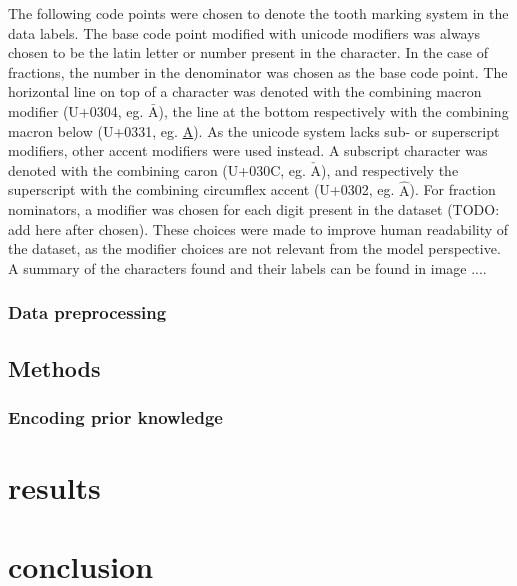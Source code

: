 \documentclass{article}
\begin{document}
The following code points were chosen to denote the tooth marking system in the data labels.
The base code point modified with unicode modifiers was always chosen to be the latin letter or number present in the character. In the case of 
fractions, the number in the denominator was chosen as the base code point. The horizontal line on top of a character was denoted with the
combining macron modifier (U+0304, eg. $\bar{\text{A}}$), the line at the bottom respectively with the combining macron below (U+0331, eg. \underline{A}).
As the unicode system lacks sub- or superscript modifiers, other accent modifiers were used instead. A subscript character was denoted with the combining caron (U+030C, eg. $\check{\mathrm{A}}$), and respectively the superscript with the combining
circumflex accent (U+0302, eg. $\hat{\text{A}}$). For fraction nominators, a modifier was chosen for each digit present in the dataset (TODO: add here after chosen).
These choices were made to improve human readability of the dataset, as the modifier choices are not relevant from the model perspective. A summary of the 
characters found and their labels can be found in image ....

\subsubsection{Data preprocessing}

\subsection{Methods}

\subsubsection{Encoding prior knowledge}

\section{results}

\section{conclusion}

\printbibliography
\end{document}
